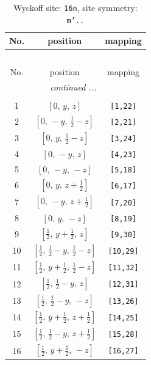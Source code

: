 \documentclass[fleqn,8pt]{jsarticle}
\begin{document}
\renewcommand{\arraystretch}{1.2}
\begin{longtable}{ccc}
\caption{Wyckoff site: {\tt 16n}, site symmetry: {\tt m'..}}
 \\
 \hline \hline
No. & position & mapping \\ \hline \endfirsthead

\multicolumn{2}{l}{\tablename\ \thetable{}} \\
 \hline \hline
No. & position & mapping \\ \hline \endhead

 \hline \hline
\multicolumn{2}{r}{\footnotesize\it continued ...} \\ \endfoot

 \hline \hline
\multicolumn{2}{r}{} \\ \endlastfoot

1 & $\left[ 0,\, y,\, z \right]$ & {\tt [1,22]} \\ \hline
2 & $\left[ 0,\, - y,\, \frac{1}{2} - z \right]$ & {\tt [2,21]} \\ \hline
3 & $\left[ 0,\, y,\, \frac{1}{2} - z \right]$ & {\tt [3,24]} \\ \hline
4 & $\left[ 0,\, - y,\, z \right]$ & {\tt [4,23]} \\ \hline
5 & $\left[ 0,\, - y,\, - z \right]$ & {\tt [5,18]} \\ \hline
6 & $\left[ 0,\, y,\, z + \frac{1}{2} \right]$ & {\tt [6,17]} \\ \hline
7 & $\left[ 0,\, - y,\, z + \frac{1}{2} \right]$ & {\tt [7,20]} \\ \hline
8 & $\left[ 0,\, y,\, - z \right]$ & {\tt [8,19]} \\ \hline
9 & $\left[ \frac{1}{2},\, y + \frac{1}{2},\, z \right]$ & {\tt [9,30]} \\ \hline
10 & $\left[ \frac{1}{2},\, \frac{1}{2} - y,\, \frac{1}{2} - z \right]$ & {\tt [10,29]} \\ \hline
11 & $\left[ \frac{1}{2},\, y + \frac{1}{2},\, \frac{1}{2} - z \right]$ & {\tt [11,32]} \\ \hline
12 & $\left[ \frac{1}{2},\, \frac{1}{2} - y,\, z \right]$ & {\tt [12,31]} \\ \hline
13 & $\left[ \frac{1}{2},\, \frac{1}{2} - y,\, - z \right]$ & {\tt [13,26]} \\ \hline
14 & $\left[ \frac{1}{2},\, y + \frac{1}{2},\, z + \frac{1}{2} \right]$ & {\tt [14,25]} \\ \hline
15 & $\left[ \frac{1}{2},\, \frac{1}{2} - y,\, z + \frac{1}{2} \right]$ & {\tt [15,28]} \\ \hline
16 & $\left[ \frac{1}{2},\, y + \frac{1}{2},\, - z \right]$ & {\tt [16,27]} \\
\end{longtable}
\end{document}
